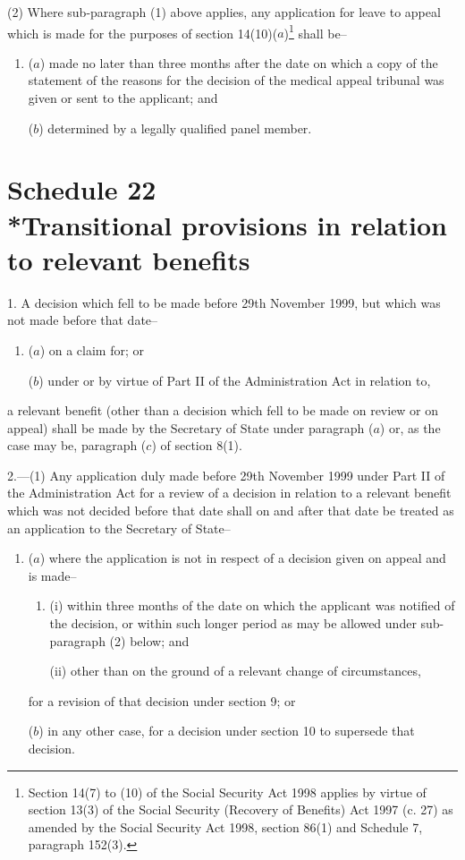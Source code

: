 \documentclass[12pt,a4paper]{article}
\begin{document}
(2) Where sub-paragraph (1) above applies, any application for leave to appeal which is made for the purposes of section 14(10)($a$)\footnote{\frenchspacing Section 14(7) to (10) of the Social Security Act 1998 applies by virtue of section 13(3) of the Social Security (Recovery of Benefits) Act 1997 (c. 27) as amended by the Social Security Act 1998, section 86(1) and Schedule 7, paragraph 152(3).} shall be–
\begin{enumerate}\item[]
($a$) made no later than three months after the date on which a copy of the statement of the reasons for the decision of the medical appeal tribunal was given or sent to the applicant; and

($b$) determined by a legally qualified panel member.
\end{enumerate}

\part[Schedule 22 --- Transitional provisions in relation to relevant benefits]{Schedule 22\\*Transitional provisions in relation to relevant benefits}

\renewcommand\parthead{--- Schedule 22}

1.  A decision which fell to be made before 29th November 1999, but which was not made before that date–
\begin{enumerate}\item[]
($a$) on a claim for; or

($b$) under or by virtue of Part II of the Administration Act in relation to,
\end{enumerate}
a relevant benefit (other than a decision which fell to be made on review or on appeal) shall be made by the Secretary of State under paragraph ($a$)  or, as the case may be, paragraph ($c$)  of section 8(1).

\medskip

2.---(1)  Any application duly made before 29th November 1999 under Part II of the Administration Act for a review of a decision in relation to a relevant benefit which was not decided before that date shall on and after that date be treated as an application to the Secretary of State–
\begin{enumerate}\item[]
($a$) where the application is not in respect of a decision given on appeal and is made–
\begin{enumerate}\item[]
(i) within three months of the date on which the applicant was notified of the decision, or within such longer period as may be allowed under sub-paragraph (2) below; and

(ii) other than on the ground of a relevant change of circumstances,
\end{enumerate}
for a revision of that decision under section 9; or

($b$) in any other case, for a decision under section 10 to supersede that decision.
\end{enumerate}
\end{document}
